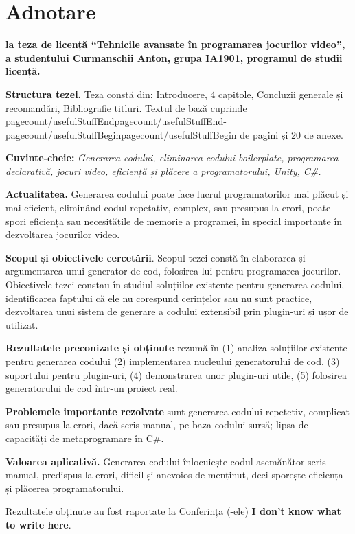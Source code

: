 \documentclass[a4paper,12pt]{report}
\def\getpagemark#1{\ifcsname pagecount/#1\endcsname \csname pagecount/#1\endcsname \else 0\fi}
\newcommand{\authorName}{Curmanschii Anton}
\newcommand{\thesisTitle}{Tehnicile avansate în programarea jocurilor video}
\newcommand{\uniGroupName}{IA1901}
\newcommand{\programulDeStudii}{licență}
\newcommand{\usefulPageCount}{%
  \the\numexpr\getpagemark{usefulStuffEnd}-\getpagemark{usefulStuffBegin}\relax}
\newcommand{\anexeCount}{20} %
\newcommand{\conferencesList}{I don't know what to write here}
\newcommand{\bibliographyEntryCount}{\total{citnum}}
\begin{document}
\clearpage
\chapter*{Adnotare}

\textbf{la teza de licență ``\thesisTitle'', a studentului \authorName{}, grupa \uniGroupName{}, programul de studii \programulDeStudii.}

\textbf{Structura tezei.}
Teza constă din: Introducere, 4 capitole, Concluzii generale și recomandări, Bibliografie \bibliographyEntryCount{} titluri.
Textul de bază cuprinde \usefulPageCount{} de pagini și \anexeCount{} de anexe.

\textbf{Cuvinte-cheie:}
\textit{Generarea codului, eliminarea codului boilerplate, programarea declarativă,
jocuri video, eficiență și plăcere a programatorului, Unity, C\#.}

\textbf{Actualitatea.}
Generarea codului poate face lucrul programatorilor mai plăcut și mai eficient,
eliminând codul repetativ, complex, sau presupus la erori, poate spori eficiența sau 
necesitățile de memorie a programei, în special importante în dezvoltarea jocurilor video.

\textbf{Scopul și obiectivele cercetării}.
Scopul tezei constă în elaborarea și argumentarea unui generator de cod, folosirea lui pentru programarea jocurilor.
Obiectivele tezei constau în studiul soluțiilor existente pentru generarea codului,
identificarea faptului că ele nu corespund cerințelor sau nu sunt practice,
dezvoltarea unui sistem de generare a codului extensibil prin plugin-uri și ușor de utilizat.
 
\textbf{Rezultatele preconizate și obținute} rezumă în (1) analiza soluțiilor existente pentru generarea codului (2) implementarea nucleului generatorului de cod, (3) suportului pentru plugin-uri, (4) demonstrarea unor plugin-uri utile, (5) folosirea generatorului de cod într-un proiect real. 

\textbf{Problemele importante rezolvate} sunt generarea codului repetetiv, complicat sau presupus la erori, dacă scris manual, pe baza codului sursă; lipsa de capacități de metaprogramare în C\#.

\textbf{Valoarea aplicativă.} Generarea codului înlocuiește codul asemănător scris manual, predispus la erori, dificil și anevoios de menținut, deci sporește eficiența și plăcerea programatorului. 


Rezultatele obținute au fost raportate la Conferința (-ele) \textbf{\conferencesList}.
\end{document}
